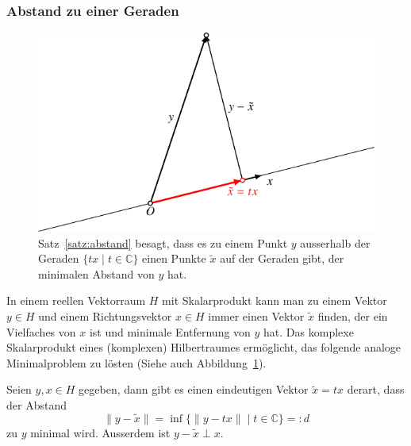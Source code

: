 \subsubsection{Abstand zu einer Geraden}
\begin{figure}
\centering
\includegraphics{chapters/1-geometrie/images/abstand.pdf}
\caption{Satz~\ref{satz:abstand} besagt, dass es zu einem Punkt $y$ ausserhalb
der Geraden $\{tx\;|\;t\in\mathbb C\}$ einen Punkte $\tilde{x}$ auf der
Geraden gibt, der minimalen Abstand von $y$ hat.
\label{figure:geradenabstand}}
\end{figure}
In einem reellen Vektorraum $H$ mit Skalarprodukt kann man zu einem Vektor
$y\in H$ und einem Richtungsvektor $x\in H$ immer einen Vektor
$\tilde{x}$ finden, der ein Vielfaches von $x$ ist und minimale Entfernung
von $y$ hat.
Das komplexe Skalarprodukt eines (komplexen) Hilbertraumes ermöglicht, 
das folgende analoge Minimalproblem zu lösten (Siehe auch
Abbildung~\ref{figure:geradenabstand}).

\begin{satz}
\label{satz:abstand}
Seien $y,x\in H$ gegeben, dann gibt es einen eindeutigen Vektor $\tilde x=tx$
derart, dass der Abstand
\[
\| y - \tilde{x}\|
=
\inf \{ \| y-t x\|\;|\; t \in \mathbb C\}
=:d
\]
zu $y$ minimal wird.
Ausserdem ist $y-\tilde{x}\perp x$.
\end{satz}


